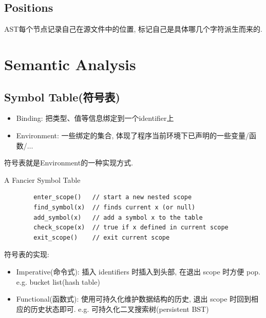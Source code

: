 \subsection{Positions}
AST每个节点记录自己在源文件中的位置, 标记自己是具体哪几个字符派生而来的. 

\section{Semantic Analysis}
\subsection{Symbol Table(符号表)}

\begin{itemize}
    \item Binding:  把类型、值等信息绑定到一个identifier上
    \item Environment: 一些绑定的集合, 体现了程序当前环境下已声明的一些变量/函数/$\dots$
\end{itemize}


符号表就是Environment的一种实现方式. 
\begin{code}
    \caption{A Fancier Symbol Table}
    \begin{verbatim}
        enter_scope()   // start a new nested scope
        find_symbol(x)  // finds current x (or null)
        add_symbol(x)   // add a symbol x to the table
        check_scope(x)  // true if x defined in current scope
        exit_scope()    // exit current scope
    \end{verbatim}
\end{code}

符号表的实现:
\begin{itemize}
    \item Imperative(命令式): 插入 identifiers 时插入到头部, 在退出 scope 时方便 pop.  e.g. bucket list(hash table)
    \item Functional(函数式): 使用可持久化维护数据结构的历史, 退出 scope 时回到相应的历史状态即可. e.g. 可持久化二叉搜索树(persistent BST)
\end{itemize}